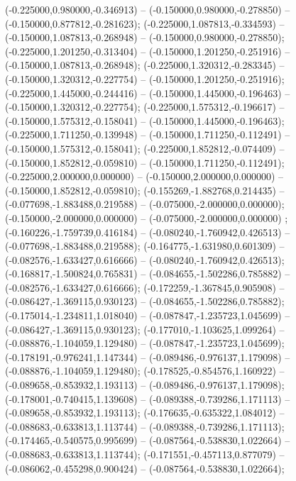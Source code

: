  (-0.225000,0.980000,-0.346913) -- (-0.150000,0.980000,-0.278850) -- (-0.150000,0.877812,-0.281623);
 (-0.225000,1.087813,-0.334593) -- (-0.150000,1.087813,-0.268948) -- (-0.150000,0.980000,-0.278850);
 (-0.225000,1.201250,-0.313404) -- (-0.150000,1.201250,-0.251916) -- (-0.150000,1.087813,-0.268948);
 (-0.225000,1.320312,-0.283345) -- (-0.150000,1.320312,-0.227754) -- (-0.150000,1.201250,-0.251916);
 (-0.225000,1.445000,-0.244416) -- (-0.150000,1.445000,-0.196463) -- (-0.150000,1.320312,-0.227754);
 (-0.225000,1.575312,-0.196617) -- (-0.150000,1.575312,-0.158041) -- (-0.150000,1.445000,-0.196463);
 (-0.225000,1.711250,-0.139948) -- (-0.150000,1.711250,-0.112491) -- (-0.150000,1.575312,-0.158041);
 (-0.225000,1.852812,-0.074409) -- (-0.150000,1.852812,-0.059810) -- (-0.150000,1.711250,-0.112491);
 (-0.225000,2.000000,0.000000) -- (-0.150000,2.000000,0.000000) -- (-0.150000,1.852812,-0.059810);
 (-0.155269,-1.882768,0.214435) -- (-0.077698,-1.883488,0.219588) -- (-0.075000,-2.000000,0.000000);
 (-0.150000,-2.000000,0.000000) -- (-0.075000,-2.000000,0.000000) ;
 (-0.160226,-1.759739,0.416184) -- (-0.080240,-1.760942,0.426513) -- (-0.077698,-1.883488,0.219588);
 (-0.164775,-1.631980,0.601309) -- (-0.082576,-1.633427,0.616666) -- (-0.080240,-1.760942,0.426513);
 (-0.168817,-1.500824,0.765831) -- (-0.084655,-1.502286,0.785882) -- (-0.082576,-1.633427,0.616666);
 (-0.172259,-1.367845,0.905908) -- (-0.086427,-1.369115,0.930123) -- (-0.084655,-1.502286,0.785882);
 (-0.175014,-1.234811,1.018040) -- (-0.087847,-1.235723,1.045699) -- (-0.086427,-1.369115,0.930123);
 (-0.177010,-1.103625,1.099264) -- (-0.088876,-1.104059,1.129480) -- (-0.087847,-1.235723,1.045699);
 (-0.178191,-0.976241,1.147344) -- (-0.089486,-0.976137,1.179098) -- (-0.088876,-1.104059,1.129480);
 (-0.178525,-0.854576,1.160922) -- (-0.089658,-0.853932,1.193113) -- (-0.089486,-0.976137,1.179098);
 (-0.178001,-0.740415,1.139608) -- (-0.089388,-0.739286,1.171113) -- (-0.089658,-0.853932,1.193113);
 (-0.176635,-0.635322,1.084012) -- (-0.088683,-0.633813,1.113744) -- (-0.089388,-0.739286,1.171113);
 (-0.174465,-0.540575,0.995699) -- (-0.087564,-0.538830,1.022664) -- (-0.088683,-0.633813,1.113744);
 (-0.171551,-0.457113,0.877079) -- (-0.086062,-0.455298,0.900424) -- (-0.087564,-0.538830,1.022664);
